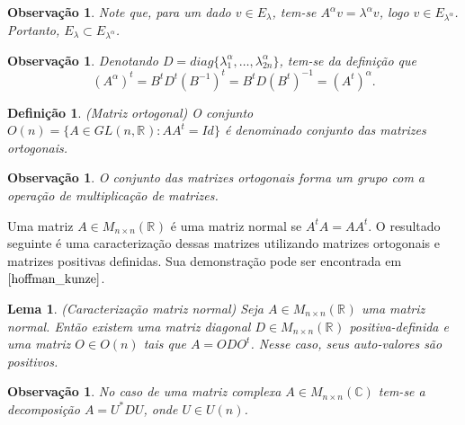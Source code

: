 \documentclass[12pt]{book}
\newtheorem{lema}[teorema]{Lema}
\newtheorem{definicao}[teorema]{Definição}
\newtheorem{observacao}[teorema]{Observação}
\newcommand{\generalgroup}[2]{GL(#1, #2)}
\newcommand{\generalgroupreal}[1]{\generalgroup{#1}{\real{}}}
\newcommand{\matrizortogonal}[1]{O(#1)}
\newcommand{\matrizquadreal}[1]{M_{#1 \times #1}(\real{})}
\newcommand{\matrizunitaria}[1]{U(#1)}
\newcommand{\real}[1]{\mathbb{R}^{#1}}
\begin{document}
	\begin{observacao}
		Note que, para um dado $v \in E_{\lambda}$, tem-se $A^{\alpha}v = \lambda^{\alpha}v$, logo $v \in E_{\lambda^{\alpha}}$. Portanto, $E_{\lambda}\subset E_{\lambda^{\alpha}}$.
	\end{observacao}
	
	\begin{observacao}\label{observacao_transposta_potenciacao_matriz}
		Denotando $D = diag\{ \lambda_{1}^{\alpha} , \dots, \lambda_{2n}^{\alpha} \}$, tem-se da definição que
		$$
		(A^{\alpha})^{t} = B^{t}D^{t}(B^{-1})^{t} = B^{t}D(B^{t})^{-1} = (A^{t})^{\alpha}.
		$$
	\end{observacao}
	
	\begin{definicao}
		(Matriz ortogonal) O conjunto $\matrizortogonal{n} =\{ A \in \generalgroupreal{n}: AA^{t}=Id \}$ é denominado conjunto das matrizes ortogonais.
	\end{definicao}
	
	\begin{observacao}
		O conjunto das matrizes ortogonais forma um grupo com a operação de multiplicação de matrizes.
	\end{observacao}
	
	Uma matriz $A\in \matrizquadreal{n}$ é uma matriz normal se $A^{t}A=AA^{t}$. O resultado seguinte é uma caracterização dessas matrizes utilizando matrizes ortogonais e matrizes positivas definidas. Sua demonstração pode ser encontrada em $\cite{hoffman_kunze}$.
	
	\begin{lema}\label{lema_caracterizacao_matriz_normal}
		(Caracterização matriz normal) Seja $A\in \matrizquadreal{n}$ uma matriz normal. Então existem uma matriz diagonal $D \in \matrizquadreal{n}$ positiva-definida e uma matriz $O\in \matrizortogonal{n}$ tais que $A=ODO^{t}$. Nesse caso, seus auto-valores são positivos. 
	\end{lema}
	
	\begin{observacao}\label{observacao_caracterizacao_matriz_normal}
		No caso de uma matriz complexa $A \in M_{n\times n}(\mathbb{C})$ tem-se a decomposição $A=U^{*}DU$, onde $U \in \matrizunitaria{n}$.
	\end{observacao}
	
\end{document}
